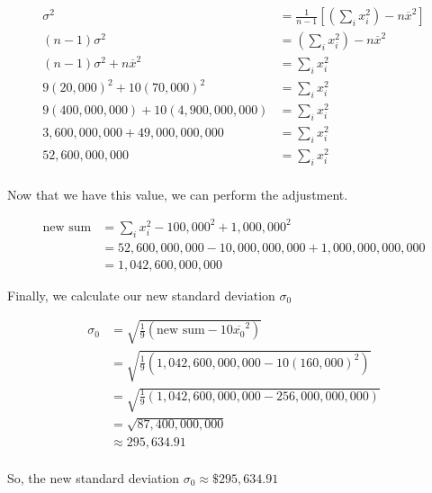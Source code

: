 \documentclass[12pt,letterpaper]{article}
\begin{document}
\begin{enumerate}
\begin{enumerate}
\begin{enumerate}[label=(\arabic*)]
              \begin{align*}
                \sigma^2 &= \frac{1}{n - 1} \left[\left(\sum_{i} x_i^2\right) - n \overline{x}^2\right] \\
                (n - 1) \sigma^2 &= \left(\sum_{i} x_i^2\right) - n \overline{x}^2 \\
                (n - 1) \sigma^2 + n \overline{x}^2 &= \sum_{i} x_i^2 \\
                9 (20,000)^2 + 10 (70,000)^2 &= \sum_{i} x_i^2 \\
                9 (400,000,000) + 10 (4,900,000,000) &= \sum_{i} x_i^2 \\
                3,600,000,000 + 49,000,000,000 &= \sum_{i} x_i^2 \\
                52,600,000,000 &= \sum_{i} x_i^2 \\
              \end{align*}

              Now that we have this value,
              we can perform the adjustment.

              \begin{align*}
                \text{new sum} &= \sum_i x_i^2 - 100,000^2 + 1,000,000^2 \\
                &= 52,600,000,000 - 10,000,000,000 + 1,000,000,000,000 \\
                &= 1,042,600,000,000
              \end{align*}

              Finally, we calculate our new standard deviation $\sigma_0$

              \begin{align*}
                \sigma_0 &= \sqrt{\frac{1}{9} \left(\text{new sum} - 10 \overline{x_0}^2\right)} \\
                &= \sqrt{\frac{1}{9} \left(1,042,600,000,000 - 10 (160,000)^2\right)} \\
                &= \sqrt{\frac{1}{9} \left(1,042,600,000,000 - 256,000,000,000 \right)} \\
                &= \sqrt{87,400,000,000} \\
                &\approx 295,634.91 \\
              \end{align*}

              So, the new standard deviation $\sigma_0 \approx \$295,634.91$

          \end{enumerate}
      \end{enumerate}


\end{enumerate}
\end{document}
